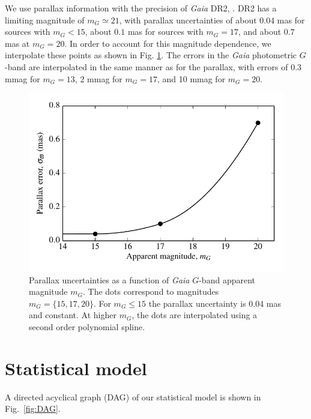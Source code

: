 \documentclass[fleqn,usenatbib]{mnras}
\begin{document}
We use parallax information with the precision of \emph{Gaia} DR2, \citep{2018arXiv180409366L}. DR2 has a limiting magnitude of $m_G \simeq 21$, with parallax uncertainties of about $0.04$ mas for sources with $m_G<15$, about $0.1$ mas for sources with $m_G=17$, and about $0.7$ mas at $m_G=20$. In order to account for this magnitude dependence, we interpolate these points as shown in Fig. \ref{fig:parallax_error}. The errors in the \emph{Gaia} photometric $G$-band are interpolated in the same manner as for the parallax, with errors of 0.3 mmag for $m_G = 13$, 2 mmag for $m_G = 17$, and 10 mmag for $m_G = 20$.

\begin{figure}
	\includegraphics[width=\columnwidth]{parallax_error.pdf}
    \caption{Parallax uncertainties as a function of \emph{Gaia} $G$-band apparent magnitude $m_G$. The dots correspond to magnitudes $m_G=\{15,17,20\}$. For $m_G\leq 15$ the parallax uncertainty is 0.04 mas and constant. At higher $m_G$, the dots are interpolated using a second order polynomial spline.}
    \label{fig:parallax_error}
\end{figure}





\section{Statistical model}\label{sec:method}

A directed acyclical graph (DAG) of our statistical model is shown in Fig.~\ref{fig:DAG}.
\end{document}
